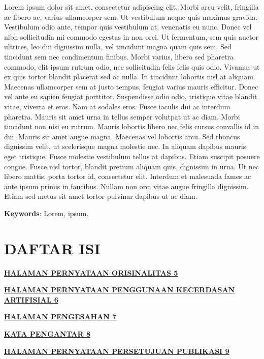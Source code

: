 \documentclass[
]{article}
\begin{document}
Lorem ipsum dolor sit amet, consectetur adipiscing elit. Morbi arcu
velit, fringilla ac libero ac, varius ullamcorper sem. Ut vestibulum
neque quis maximus gravida. Vestibulum odio ante, tempor quis vestibulum
at, venenatis eu nunc. Donec vel nibh sollicitudin mi commodo egestas in
non orci. Ut fermentum, sem quis auctor ultrices, leo dui dignissim
nulla, vel tincidunt magna quam quis sem. Sed tincidunt sem nec
condimentum finibus. Morbi varius, libero sed pharetra commodo, elit
ipsum rutrum odio, nec sollicitudin felis felis quis odio. Vivamus ut ex
quis tortor blandit placerat sed ac nulla. In tincidunt lobortis nisl at
aliquam. Maecenas ullamcorper sem at justo tempus, feugiat varius mauris
efficitur. Donec vel ante eu sapien feugiat porttitor. Suspendisse odio
odio, tristique vitae blandit vitae, viverra et eros. Nam at sodales
eros. Fusce iaculis dui ac interdum pharetra. Mauris sit amet urna in
tellus semper volutpat ut ac diam. Morbi tincidunt non nisi eu rutrum.
Mauris lobortis libero nec felis cursus convallis id in dui. Mauris sit
amet augue magna. Maecenas vel lobortis arcu. Sed rhoncus dignissim
velit, ut scelerisque magna molestie nec. In aliquam dapibus mauris eget
tristique. Fusce molestie vestibulum tellus at dapibus. Etiam suscipit
posuere congue. Fusce nisl tortor, blandit pretium aliquam quis,
dignissim in urna. Ut nec libero mattis, porta tortor id, consectetur
elit. Interdum et malesuada fames ac ante ipsum primis in faucibus.
Nullam non orci vitae augue fringilla dignissim. Etiam sed metus sit
amet tortor pulvinar dapibus ut ac diam.

\textbf{Keywords}: Lorem, ipsum.

\hypertarget{daftar-isi}{%
\section{DAFTAR ISI}\label{daftar-isi}}

\protect\hyperlink{halaman-pernyataan-orisinalitas}{\textbf{HALAMAN
PERNYATAAN ORISINALITAS 5}}

\protect\hyperlink{halaman-pernyataan-penggunaan-kecerdasan-artifisial}{\textbf{HALAMAN
PERNYATAAN PENGGUNAAN KECERDASAN ARTIFISIAL 6}}

\protect\hyperlink{halaman-pengesahan}{\textbf{HALAMAN PENGESAHAN 7}}

\protect\hyperlink{kata-pengantar}{\textbf{KATA PENGANTAR 8}}

\protect\hyperlink{halaman-pernyataan-persetujuan-publikasi}{\textbf{HALAMAN
PERNYATAAN PERSETUJUAN PUBLIKASI 9}}
\end{document}
